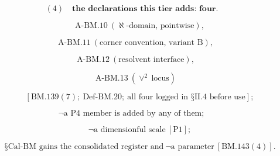 \documentclass[11pt,openany]{report}
\theoremstyle{canonplain}
\theoremstyle{canondef}
\begin{document}
\[
(4)\quad\textbf{the declarations this tier adds: four.}
\]

\[
\qquad \text{A-BM.10}\ (\aleph\text{-domain, pointwise}),
\]

\[
\quad\text{A-BM.11}\ (\text{corner convention, variant B}),
\]

\[
\quad\text{A-BM.12}\ (\text{resolvent interface}),
\]

\[
\quad\text{A-BM.13}\ (\vee^2\ \text{locus})
\]

\[
\qquad [\mathrm{BM.139}(7);\ \mathrm{Def\text{-}BM.20};\ \text{all four logged in §II.4 before use}];
\]

\[
\neg\text{a P4 member is added by any of them};
\]

\[
\qquad \neg\text{a dimensionful scale}\ [\mathrm{P1}];
\]

\[
\qquad \text{§Cal-BM gains the consolidated register and}\ \neg\text{a parameter}\ [\mathrm{BM.143}(4)].
\]
\end{document}
